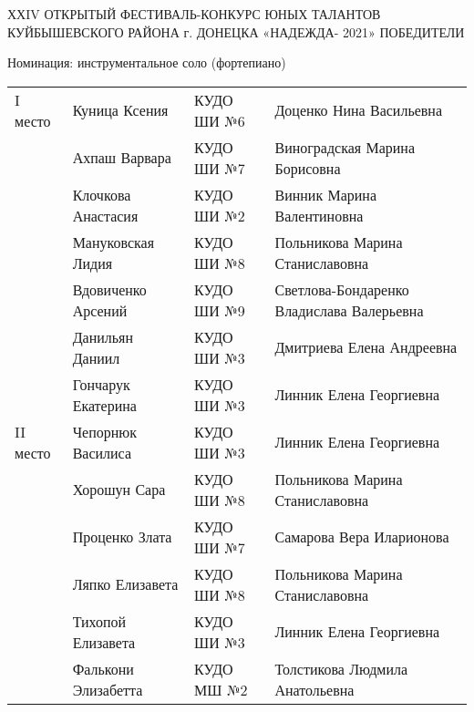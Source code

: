  
 
 
 
 

ХХIV ОТКРЫТЫЙ ФЕСТИВАЛЬ-КОНКУРС ЮНЫХ ТАЛАНТОВ КУЙБЫШЕВСКОГО РАЙОНА г. ДОНЕЦКА «НАДЕЖДА- 2021»
ПОБЕДИТЕЛИ

Номинация: инструментальное соло (фортепиано)

\begin{longtable}{|l|l|l|l|}
I место   & Куница Ксения        & КУДО ШИ №6         & Доценко Нина Васильевна                   \\
          & Ахпаш Варвара        & КУДО ШИ №7         & Виноградская Марина Борисовна             \\
          & Клочкова Анастасия   & КУДО ШИ №2         & Винник Марина Валентиновна                \\
          & Мануковская Лидия    & КУДО ШИ №8         & Польникова Марина Станиславовна           \\
          & Вдовиченко Арсений   & КУДО ШИ №9         & Светлова-Бондаренко Владислава Валерьевна \\
          & Данильян Даниил      & КУДО ШИ №3         & Дмитриева Елена Андреевна                 \\
          & Гончарук Екатерина   & КУДО ШИ №3         & Линник Елена Георгиевна                   \\
II место  & Чепорнюк Василиса    & КУДО ШИ №3         & Линник Елена Георгиевна                   \\
          & Хорошун Сара         & КУДО ШИ №8         & Польникова Марина Станиславовна           \\
          & Проценко Злата       & КУДО ШИ №7         & Самарова Вера Иларионова                  \\
          & Ляпко Елизавета      & КУДО ШИ №8         & Польникова Марина Станиславовна           \\
          & Тихопой Елизавета    & КУДО ШИ №3         & Линник Елена Георгиевна                   \\
          & Фалькони Элизабетта  & КУДО МШ №2         & Толстикова Людмила Анатольевна            \\

\end{longtable}
